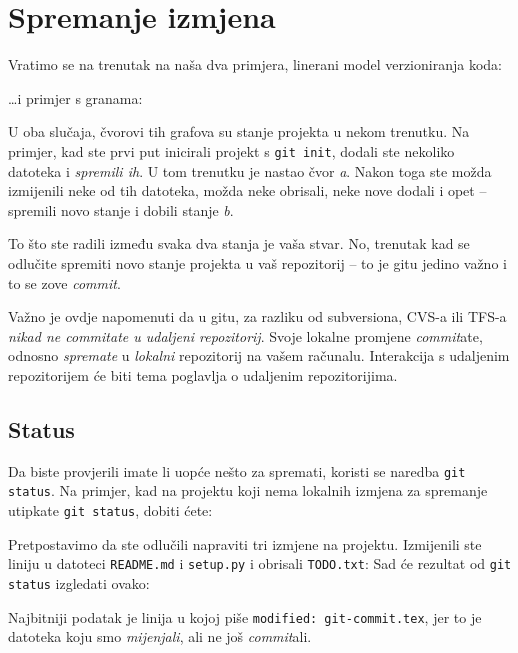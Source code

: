 \chapter*{Spremanje izmjena}

Vratimo se na trenutak na naša dva primjera, linerani model verzioniranja koda:



\dots{}i primjer s granama:



U oba slučaja, čvorovi tih grafova su stanje projekta u nekom trenutku.
Na primjer, kad ste prvi put inicirali projekt s \verb+git init+, dodali ste nekoliko datoteka i \emph{spremili ih}. 
U tom trenutku je nastao čvor \emph a.
Nakon toga ste možda izmijenili neke od tih datoteka, možda neke obrisali, neke nove dodali i opet -- spremili novo stanje i dobili stanje \emph b.

To što ste radili između svaka dva stanja je vaša stvar.
No, trenutak kad se odlučite spremiti novo stanje projekta u vaš repozitorij -- to je gitu jedino važno i to se zove \emph{commit}.

Važno je ovdje napomenuti da u gitu, za razliku od subversiona, CVS-a ili TFS-a \emph{nikad ne commitate u udaljeni repozitorij}. 
Svoje lokalne promjene \emph{commit}ate, odnosno \emph{spremate} u \emph{lokalni} repozitorij na vašem računalu.
Interakcija s udaljenim repozitorijem će biti tema poglavlja o udaljenim repozitorijima.

\section*{Status}

Da biste provjerili imate li uopće nešto za spremati, koristi se naredba \verb+git status+.
Na primjer, kad na projektu koji nema lokalnih izmjena za spremanje utipkate \verb+git status+, dobiti ćete:



Pretpostavimo da ste odlučili napraviti tri izmjene na projektu.
Izmijenili ste liniju u datoteci \verb+README.md+ i \verb+setup.py+ i obrisali \verb+TODO.txt+:
Sad će rezultat od \verb+git status+ izgledati ovako:



Najbitniji podatak je linija u kojoj piše \verb+modified: git-commit.tex+, jer to je datoteka koju smo \emph{mijenjali}, ali ne još \emph{commit}ali.

